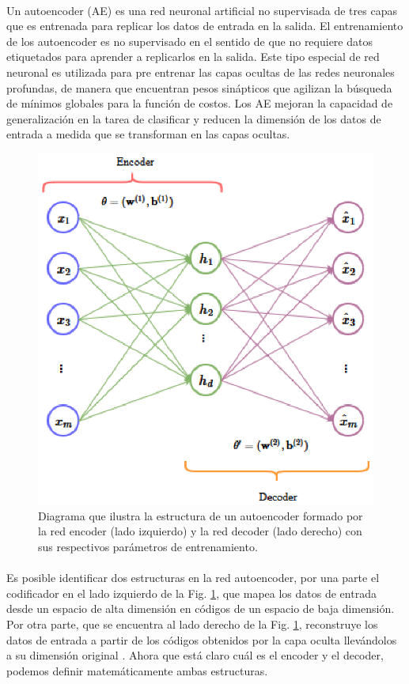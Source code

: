 \documentclass[12pt]{article}%
\begin{document}
\paragraph{}
Un autoencoder (AE) es una red neuronal artificial no supervisada de tres capas que es entrenada para replicar los datos de entrada en la salida. El entrenamiento de los autoencoder es no supervisado en el sentido de que no requiere datos etiquetados para aprender a replicarlos en la salida. Este tipo especial de red neuronal es utilizada para pre entrenar las capas ocultas de las redes neuronales profundas, de manera que encuentran pesos sinápticos que agilizan la búsqueda de mínimos globales para la función de costos. Los AE mejoran la capacidad de generalización en la tarea de clasificar y reducen la dimensión de los datos de entrada a medida que se transforman en las capas ocultas.

\begin{figure}[ht]
  \centering
    \includegraphics{./AE.eps}
  \caption{Diagrama que ilustra la estructura de un autoencoder formado por la red encoder (lado izquierdo) y la red decoder (lado derecho) con sus respectivos parámetros de entrenamiento.}
  \label{fig:ae}
\end{figure}

\paragraph{}
Es posible identificar dos estructuras en la red autoencoder, por una parte el codificador en el lado izquierdo de la Fig. \ref{fig:ae}, que mapea los datos de entrada desde un espacio de alta dimensión en códigos de un espacio de baja dimensión. Por otra parte, que se encuentra al lado derecho de la Fig. \ref{fig:ae}, reconstruye los datos de entrada a partir de los códigos obtenidos por la capa oculta llevándolos a su dimensión original \cite{shao}. Ahora que está claro cuál es el encoder y el decoder, podemos definir matemáticamente ambas estructuras.
\end{document}
